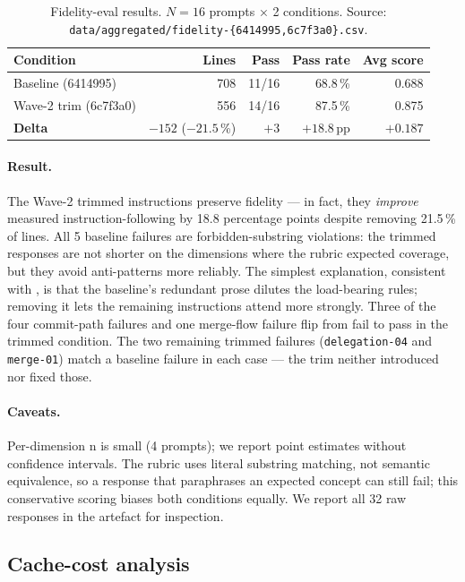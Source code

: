 \begin{table}[h]
\centering
\caption{Fidelity-eval results. $N{=}16$ prompts × 2 conditions.
Source: \texttt{data/aggregated/fidelity-\{6414995,6c7f3a0\}.csv}.}
\label{tab:fidelity-results}
\begin{tabular}{lrrrr}
\toprule
Condition & Lines & Pass & Pass rate & Avg score \\
\midrule
Baseline (6414995)  & 708 & 11/16 & 68.8\,\% & 0.688 \\
Wave-2 trim (6c7f3a0) & 556 & 14/16 & 87.5\,\% & 0.875 \\
\midrule
\textbf{Delta}      & $-152$ ($-21.5$\,\%) & $+3$ & $+18.8$\,pp & $+0.187$ \\
\bottomrule
\end{tabular}
\end{table}

\paragraph{Result.}
The Wave-2 trimmed instructions preserve fidelity --- in fact, they
\emph{improve} measured instruction-following by 18.8 percentage
points despite removing 21.5\,\% of lines. All 5 baseline failures
are forbidden-substring violations: the trimmed responses are not
shorter on the dimensions where the rubric expected coverage, but
they avoid anti-patterns more reliably. The simplest explanation,
consistent with \cite{lostinmiddle}, is that the baseline's
redundant prose dilutes the load-bearing rules; removing it lets the
remaining instructions attend more strongly. Three of the four
commit-path failures and one merge-flow failure flip from fail to
pass in the trimmed condition. The two remaining trimmed failures
(\texttt{delegation-04} and \texttt{merge-01}) match a baseline
failure in each case --- the trim neither introduced nor fixed
those.

\paragraph{Caveats.}
Per-dimension n is small (4 prompts); we report point estimates
without confidence intervals. The rubric uses literal substring
matching, not semantic equivalence, so a response that paraphrases
an expected concept can still fail; this conservative scoring biases
both conditions equally. We report all 32 raw responses in the
artefact for inspection.

\subsection{Cache-cost analysis}

